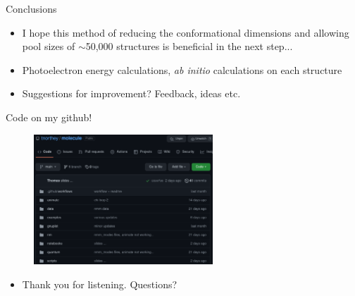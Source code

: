 \documentclass{beamer}
\begin{document}
\begin{frame}{Conclusions}
	\begin{itemize}
		\item I hope this method of reducing the conformational dimensions and allowing pool sizes of $\sim$50,000 structures is beneficial in the next step...
		\item Photoelectron energy calculations, \textit{ab initio} calculations on each structure
		\item Suggestions for improvement? Feedback, ideas etc.\
	\end{itemize}
\end{frame}

\begin{frame}{Code on my github!}
	\begin{figure}
		\includegraphics[width=0.6\textwidth]{github.png}
	\end{figure}
	\begin{itemize}
		\item Thank you for listening. Questions?
	\end{itemize}
\end{frame}
\end{document}
